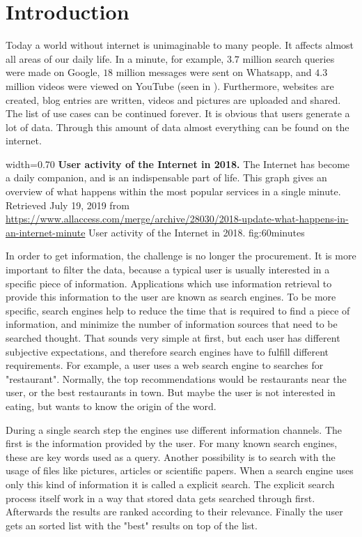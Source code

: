 \chapter{Introduction}
\label{cha:introduction}

Today a world without internet is unimaginable to many people. It affects almost all areas of our daily life. In a minute, for example, $3.7$ million search queries were made on Google, $18$ million messages were sent on Whatsapp, and $4.3$ million videos were viewed on YouTube (seen in ). Furthermore, websites are created, blog entries are written, videos and pictures are uploaded and shared. The list of use cases can be continued forever. It is obvious that users generate a lot of data. Through this amount of data almost everything can be found on the internet.

      {width=0.70\textwidth}
      {\textbf{User activity of the Internet in 2018.} The Internet has become a daily companion, and is an indispensable part of life. This graph gives an overview of what happens within the most popular services in a single minute. Retrieved July 19, 2019 from \url{https://www.allaccess.com/merge/archive/28030/2018-update-what-happens-in-an-internet-minute}}
      {User activity of the Internet in 2018.}
      {fig:60minutes}

In order to get information, the challenge is no longer the procurement. It is more important to filter the data, because a typical user is usually interested in a specific piece of information. Applications which use information retrieval to provide this information to the user are known as search engines. To be more specific, search engines help to reduce the time that is required to find a piece of information, and minimize the number of information sources that need to be searched thought. That sounds very simple at first, but each user has different subjective expectations, and therefore search engines have to fulfill different requirements. For example, a user uses a web search engine to searches for "restaurant". Normally, the top recommendations would be restaurants near the user, or the best restaurants in town. But maybe the user is not interested in eating, but wants to know the origin of the word.

During a single search step the engines use different information channels. The first is the information provided by the user. For many known search engines, these are key words used as a query. Another possibility is to search with the usage of files like pictures, articles or scientific papers. When a search engine uses only this kind of information it is called a explicit search. The explicit search process itself work in a way that stored data gets searched through first. Afterwards the results are ranked according to their relevance. Finally the user gets an sorted list with the "best" results on top of the list.

